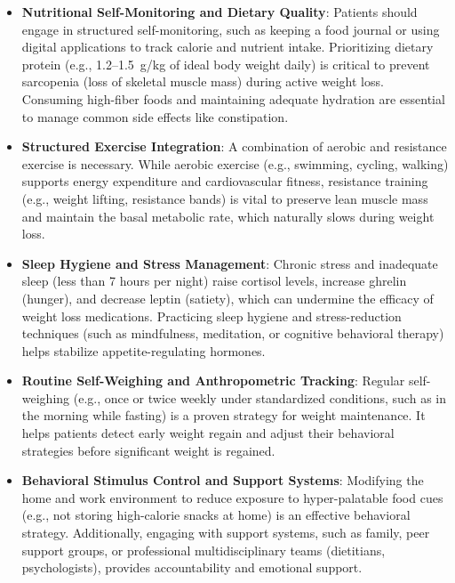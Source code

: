 \begin{itemize}
\item \textbf{Nutritional Self-Monitoring and Dietary Quality}: Patients should engage in structured self-monitoring, such as keeping a food journal or using digital applications to track calorie and nutrient intake. Prioritizing dietary protein (e.g., 1.2--1.5~g/kg of ideal body weight daily) is critical to prevent sarcopenia (loss of skeletal muscle mass) during active weight loss. Consuming high-fiber foods and maintaining adequate hydration are essential to manage common side effects like constipation.
\item \textbf{Structured Exercise Integration}: A combination of aerobic and resistance exercise is necessary. While aerobic exercise (e.g., swimming, cycling, walking) supports energy expenditure and cardiovascular fitness, resistance training (e.g., weight lifting, resistance bands) is vital to preserve lean muscle mass and maintain the basal metabolic rate, which naturally slows during weight loss.
\item \textbf{Sleep Hygiene and Stress Management}: Chronic stress and inadequate sleep (less than 7 hours per night) raise cortisol levels, increase ghrelin (hunger), and decrease leptin (satiety), which can undermine the efficacy of weight loss medications. Practicing sleep hygiene and stress-reduction techniques (such as mindfulness, meditation, or cognitive behavioral therapy) helps stabilize appetite-regulating hormones.
\item \textbf{Routine Self-Weighing and Anthropometric Tracking}: Regular self-weighing (e.g., once or twice weekly under standardized conditions, such as in the morning while fasting) is a proven strategy for weight maintenance. It helps patients detect early weight regain and adjust their behavioral strategies before significant weight is regained.
\item \textbf{Behavioral Stimulus Control and Support Systems}: Modifying the home and work environment to reduce exposure to hyper-palatable food cues (e.g., not storing high-calorie snacks at home) is an effective behavioral strategy. Additionally, engaging with support systems, such as family, peer support groups, or professional multidisciplinary teams (dietitians, psychologists), provides accountability and emotional support.
\end{itemize}

